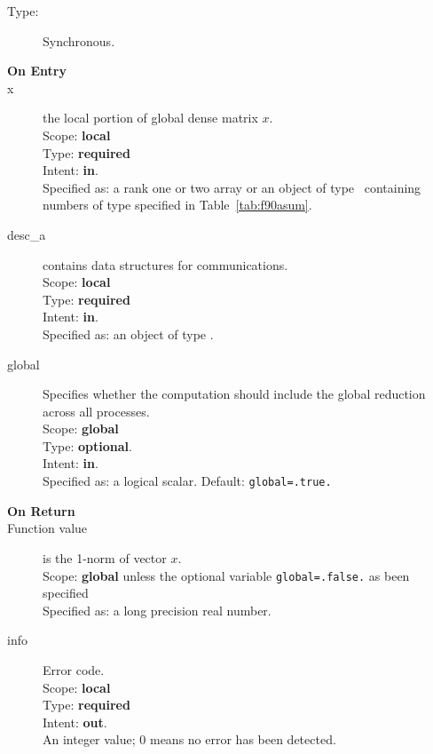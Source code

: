 \begin{description}
\item[Type:] Synchronous.
\item[\bf On Entry]
\item[x] the local portion of global dense matrix
$x$. %
\\
Scope: {\bf local} \\
Type: {\bf required} \\
Intent: {\bf in}.\\
Specified as: a rank one or two array or an object of type \vdata\ 
containing numbers of type specified in
Table~\ref{tab:f90asum}.
\item[desc\_a] contains data structures for communications.\\
Scope: {\bf local} \\
Type: {\bf required}\\
Intent: {\bf in}.\\
Specified as: an object of type \descdata.
\item[global]  Specifies whether the computation should include the
  global reduction across all processes.\\
Scope: {\bf global} \\
Type: {\bf optional}.\\
Intent: {\bf in}.\\
Specified as: a logical scalar.
Default: \verb|global=.true.|\\

\item[\bf On Return] 
\item[Function value] is the 1-norm of vector $x$.\\
Scope: {\bf global} unless the optional variable
\verb|global=.false.| as been specified\\
Specified as: a long precision real  number.
\item[info] Error code.\\
Scope: {\bf local} \\
Type: {\bf required} \\
Intent: {\bf out}.\\
An integer value; 0 means no error has been detected. 
\end{description}

